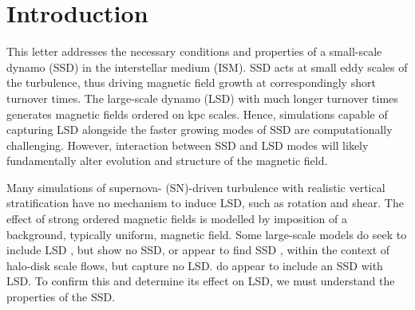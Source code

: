 \documentclass[preprint2]{aastex63}
\newcommand{\fg}[1]{\textcolor{midgreen}{#1}}
\begin{document}
\section{Introduction}\label{sec:intro}


 This letter addresses the necessary conditions and properties of a small-scale
 dynamo (SSD) in the interstellar medium (ISM).
 SSD acts at small eddy scales of the turbulence, thus driving magnetic field
 growth at correspondingly short turnover times.
 \fg{The large-scale dynamo (LSD) with much longer turnover times generates
 magnetic fields ordered on kpc scales.}
 Hence, simulations capable of capturing LSD alongside the faster growing modes
 of SSD are computationally challenging.
 However, \fg{interaction between SSD and LSD modes will likely
 fundamentally alter} evolution and structure of the magnetic field.

 Many simulations of supernova- (SN)-driven turbulence with realistic vertical
 stratification \citep[e.g.,][]{deAvillez:2005,PO07,Hill:2012a,HI14} have no
 mechanism to induce LSD, such as rotation and shear.
 The effect of strong ordered magnetic fields is modelled by
 imposition of a background, typically uniform, magnetic field.
 \fg{Some large-scale models do seek to include LSD 
 \citep[e.g.,][]{Korpi:1999b,Gressel:2008,HWK09,WA09,Pakmor17,
 GE20}, but show no SSD, or appear to find SSD 
 \citep[e.g.,][]{RT16,SBADMN19}, within the context of halo-disk
 scale flows, but capture no LSD.}
 \citet{Gent:2013b,EGSFB16} do appear to include an \fg{SSD with LSD}.
 To confirm this and determine its effect on LSD, we must understand the
 properties of the SSD.
     
\end{document}
